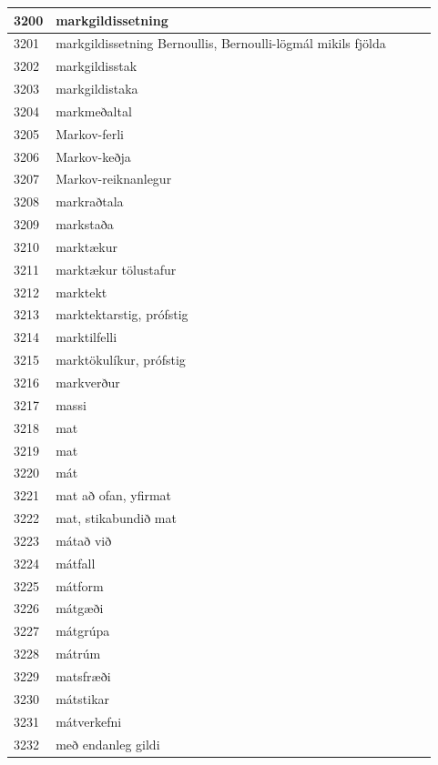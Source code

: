 \begin{longtable}{p{}|p{}|p{}|p{}|p{}}
\hline
3200 & markgildissetning &  &  &  \\
\hline
3201 & markgildissetning Bernoullis, Bernoulli-lögmál mikils fjölda &  &  &  \\
\hline
3202 & markgildisstak &  &  &  \\
\hline
3203 & markgildistaka &  &  &  \\
\hline
3204 & markmeðaltal &  &  &  \\
\hline
3205 & Markov-ferli &  &  &  \\
\hline
3206 & Markov-keðja &  &  &  \\
\hline
3207 & Markov-reiknanlegur &  &  &  \\
\hline
3208 & markraðtala &  &  &  \\
\hline
3209 & markstaða &  &  &  \\
\hline
3210 & marktækur &  &  &  \\
\hline
3211 & marktækur tölustafur &  &  &  \\
\hline
3212 & marktekt &  &  &  \\
\hline
3213 & marktektarstig, prófstig &  &  &  \\
\hline
3214 & marktilfelli &  &  &  \\
\hline
3215 & marktökulíkur, prófstig &  &  &  \\
\hline
3216 & markverður &  &  &  \\
\hline
3217 & massi &  &  &  \\
\hline
3218 & mat &  &  &  \\
\hline
3219 & mat &  &  &  \\
\hline
3220 & mát &  &  &  \\
\hline
3221 & mat að ofan, yfirmat &  &  &  \\
\hline
3222 & mat, stikabundið mat &  &  &  \\
\hline
3223 & mátað við &  &  &  \\
\hline
3224 & mátfall &  &  &  \\
\hline
3225 & mátform &  &  &  \\
\hline
3226 & mátgæði &  &  &  \\
\hline
3227 & mátgrúpa &  &  &  \\
\hline
3228 & mátrúm &  &  &  \\
\hline
3229 & matsfræði &  &  &  \\
\hline
3230 & mátstikar &  &  &  \\
\hline
3231 & mátverkefni &  &  &  \\
\hline
3232 & með endanleg gildi &  &  &  \\

\end{longtable}
